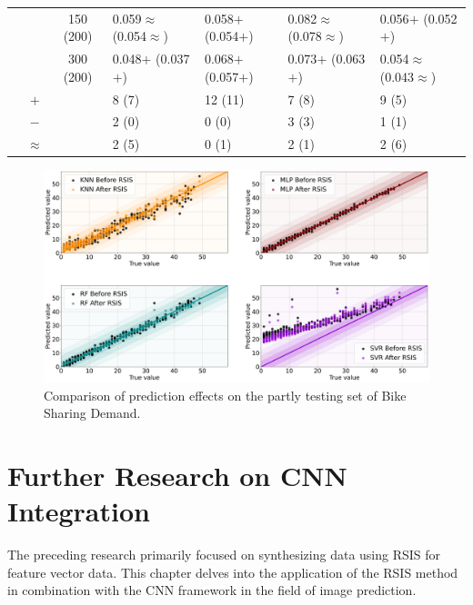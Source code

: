 \documentclass[final,3p,times]{elsarticle}
\begin{document}
\begin{table}
\begin{tabularx}{\textwidth}{cccXXXX}
    &  & 150 (200) & 0.059$\approx$ (0.054$\approx$) & 0.058$+$ (0.054$+$) & 0.082$\approx$ (0.078$\approx$) & 0.056$+$ (0.052$+$) \\
    &  & 300 (200) & 0.048$+$ (0.037$+$) & 0.068$+$ (0.057$+$) & 0.073$+$ (0.063$+$) & 0.054$\approx$ (0.043$\approx$) \\
  \cmidrule{1-7}
    & $+$ &  & 8 (7) & 12 (11) & 7 (8) & 9 (5) \\
    & $-$ &  & 2 (0) & 0 (0) & 3 (3) & 1 (1) \\
    & $\approx$ &  & 2 (5) & 0 (1) & 2 (1) & 2 (6) \\
  \bottomrule
  \end{tabularx}
\end{table}

\begin{figure}[h!]
  \centering
  \includegraphics[scale=0.285]{Fig6.png}
  \caption{Comparison of prediction effects on the partly testing 
  set of Bike Sharing Demand.}
  \label{Fig6}
\end{figure}





\newpage
\section{Further Research on CNN Integration}
The preceding research primarily focused on synthesizing data 
using RSIS for feature vector data. This chapter delves into the 
application of the RSIS method in combination with the CNN 
framework in the field of image prediction.
\end{document}
